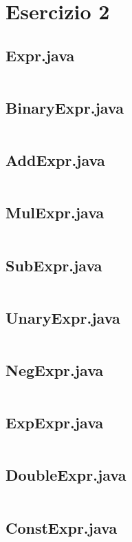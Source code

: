 \section*{Esercizio 2}

\subsection*{Expr.java}
\inputminted{java}{tex/src/2/Expr.java}

\subsection*{BinaryExpr.java}
\inputminted{java}{tex/src/2/BinaryExpr.java}

\subsection*{AddExpr.java}
\inputminted{java}{tex/src/2/AddExpr.java}

\subsection*{MulExpr.java}
\inputminted{java}{tex/src/2/MulExpr.java}

\subsection*{SubExpr.java}
\inputminted{java}{tex/src/2/SubExpr.java}

\subsection*{UnaryExpr.java}
\inputminted{java}{tex/src/2/UnaryExpr.java}

\subsection*{NegExpr.java}
\inputminted{java}{tex/src/2/NegExpr.java}

\subsection*{ExpExpr.java}
\inputminted{java}{tex/src/2/ExpExpr.java}

\subsection*{DoubleExpr.java}
\inputminted{java}{tex/src/2/DoubleExpr.java}

\subsection*{ConstExpr.java}
\inputminted{java}{tex/src/2/ConstExpr.java}
